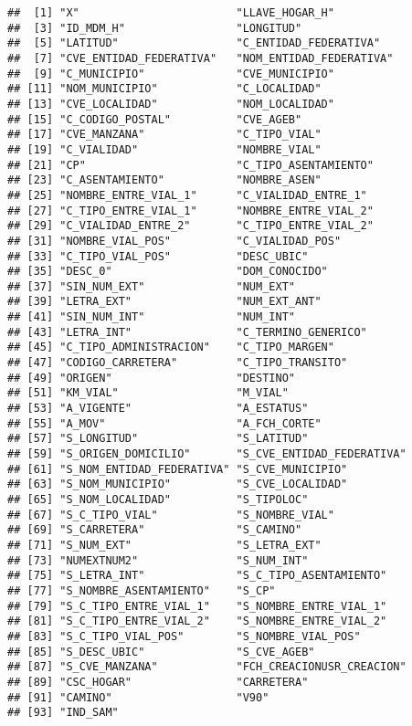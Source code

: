 \documentclass[11pt,]{article}
\begin{document}
\begin{verbatim}
##  [1] "X"                        "LLAVE_HOGAR_H"           
##  [3] "ID_MDM_H"                 "LONGITUD"                
##  [5] "LATITUD"                  "C_ENTIDAD_FEDERATIVA"    
##  [7] "CVE_ENTIDAD_FEDERATIVA"   "NOM_ENTIDAD_FEDERATIVA"  
##  [9] "C_MUNICIPIO"              "CVE_MUNICIPIO"           
## [11] "NOM_MUNICIPIO"            "C_LOCALIDAD"             
## [13] "CVE_LOCALIDAD"            "NOM_LOCALIDAD"           
## [15] "C_CODIGO_POSTAL"          "CVE_AGEB"                
## [17] "CVE_MANZANA"              "C_TIPO_VIAL"             
## [19] "C_VIALIDAD"               "NOMBRE_VIAL"             
## [21] "CP"                       "C_TIPO_ASENTAMIENTO"     
## [23] "C_ASENTAMIENTO"           "NOMBRE_ASEN"             
## [25] "NOMBRE_ENTRE_VIAL_1"      "C_VIALIDAD_ENTRE_1"      
## [27] "C_TIPO_ENTRE_VIAL_1"      "NOMBRE_ENTRE_VIAL_2"     
## [29] "C_VIALIDAD_ENTRE_2"       "C_TIPO_ENTRE_VIAL_2"     
## [31] "NOMBRE_VIAL_POS"          "C_VIALIDAD_POS"          
## [33] "C_TIPO_VIAL_POS"          "DESC_UBIC"               
## [35] "DESC_0"                   "DOM_CONOCIDO"            
## [37] "SIN_NUM_EXT"              "NUM_EXT"                 
## [39] "LETRA_EXT"                "NUM_EXT_ANT"             
## [41] "SIN_NUM_INT"              "NUM_INT"                 
## [43] "LETRA_INT"                "C_TERMINO_GENERICO"      
## [45] "C_TIPO_ADMINISTRACION"    "C_TIPO_MARGEN"           
## [47] "CODIGO_CARRETERA"         "C_TIPO_TRANSITO"         
## [49] "ORIGEN"                   "DESTINO"                 
## [51] "KM_VIAL"                  "M_VIAL"                  
## [53] "A_VIGENTE"                "A_ESTATUS"               
## [55] "A_MOV"                    "A_FCH_CORTE"             
## [57] "S_LONGITUD"               "S_LATITUD"               
## [59] "S_ORIGEN_DOMICILIO"       "S_CVE_ENTIDAD_FEDERATIVA"
## [61] "S_NOM_ENTIDAD_FEDERATIVA" "S_CVE_MUNICIPIO"         
## [63] "S_NOM_MUNICIPIO"          "S_CVE_LOCALIDAD"         
## [65] "S_NOM_LOCALIDAD"          "S_TIPOLOC"               
## [67] "S_C_TIPO_VIAL"            "S_NOMBRE_VIAL"           
## [69] "S_CARRETERA"              "S_CAMINO"                
## [71] "S_NUM_EXT"                "S_LETRA_EXT"             
## [73] "NUMEXTNUM2"               "S_NUM_INT"               
## [75] "S_LETRA_INT"              "S_C_TIPO_ASENTAMIENTO"   
## [77] "S_NOMBRE_ASENTAMIENTO"    "S_CP"                    
## [79] "S_C_TIPO_ENTRE_VIAL_1"    "S_NOMBRE_ENTRE_VIAL_1"   
## [81] "S_C_TIPO_ENTRE_VIAL_2"    "S_NOMBRE_ENTRE_VIAL_2"   
## [83] "S_C_TIPO_VIAL_POS"        "S_NOMBRE_VIAL_POS"       
## [85] "S_DESC_UBIC"              "S_CVE_AGEB"              
## [87] "S_CVE_MANZANA"            "FCH_CREACIONUSR_CREACION"
## [89] "CSC_HOGAR"                "CARRETERA"               
## [91] "CAMINO"                   "V90"                     
## [93] "IND_SAM"
\end{verbatim}
\end{document}
